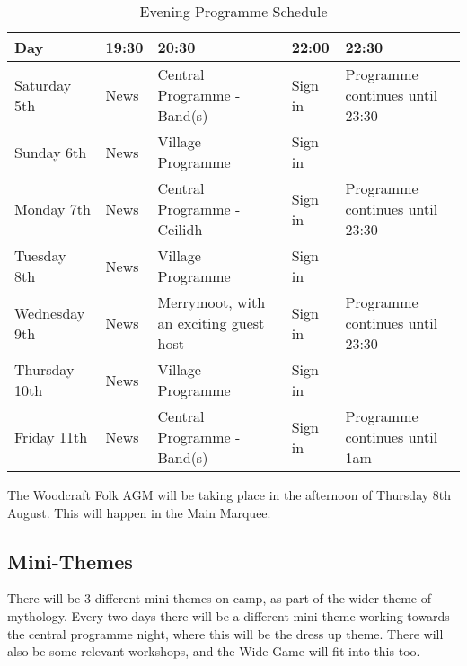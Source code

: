 \documentclass[a4paper, 11pt]{report}
\begin{document}
\begin{table}[H]
    \centering
    {\RaggedRight
    \begin{tabular}{p{} p{} p{} p{} p{}}
    \textbf{Day} & \textbf{19:30} & \textbf{20:30} & \textbf{22:00} & \textbf{22:30} \\
    \hline
    Saturday 5th & News & Central Programme  - Band(s) & Sign in & Programme continues until 23:30 \\
    \hline
    Sunday 6th & News & Village Programme & Sign in &  \\
    \hline
    Monday 7th & News & Central Programme - Ceilidh & Sign in & Programme continues until 23:30 \\
    \hline
    Tuesday 8th & News & Village Programme & Sign in &  \\
    \hline
    Wednesday 9th & News & Merrymoot, with an exciting guest host & Sign in & Programme continues until 23:30 \\
    \hline
    Thursday 10th & News & Village Programme & Sign in &  \\
    \hline
    Friday 11th & News & Central Programme - Band(s) & Sign in & Programme continues until 1am\\
    \hline
    \end{tabular}
    }%
    \caption{Evening Programme Schedule}
\end{table}

The Woodcraft Folk AGM will be taking place in the afternoon of Thursday 8th August. This will happen in the Main Marquee.

\subsection{Mini-Themes}
There will be 3 different mini-themes on camp, as part of the wider theme of mythology. Every two days there will be a different mini-theme working towards the central programme night, where this will be the dress up theme. There will also be some relevant workshops, and the Wide Game will fit into this too.
\end{document}
